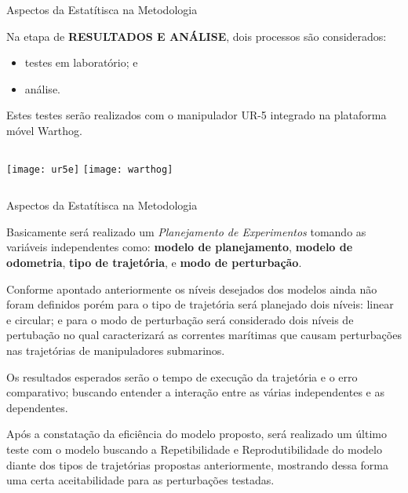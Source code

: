 \begin{frame}[t]{Aspectos da Estatítisca na Metodologia}


    Na etapa de \textbf{RESULTADOS E ANÁLISE}, dois processos são considerados:
    \begin{itemize}
        \item testes em laboratório; e 
        \item análise.
    \end{itemize}
    Estes testes serão realizados com o manipulador UR-5 integrado na plataforma móvel Warthog.

    \begin{columns}
            \centering
            \texttt{[image: ur5e]}
            \centering
            \texttt{[image: warthog]}
    \end{columns}

\end{frame}
\begin{frame}[t, shrink=10]{Aspectos da Estatítisca na Metodologia}

    Basicamente será realizado um \textit{Planejamento de Experimentos} tomando as variáveis independentes como: \textbf{modelo de planejamento}, \textbf{modelo de odometria}, \textbf{tipo de trajetória}, e \textbf{modo de perturbação}.
    \vspace*{0.2cm}

    Conforme apontado anteriormente os níveis desejados dos modelos ainda não foram definidos porém para o tipo de trajetória será planejado dois níveis: linear e circular; e para o modo de perturbação será considerado dois níveis de pertubação no qual caracterizará as correntes marítimas que causam perturbações nas trajetórias de manipuladores submarinos.

    \vspace*{0.2cm}
    Os resultados esperados serão o tempo de execução da trajetória e o erro comparativo; buscando entender a interação entre as várias independentes e as dependentes.

    \vspace*{0.2cm}
    Após a constatação da eficiência do modelo proposto, será realizado um último teste com o modelo buscando a Repetibilidade e Reprodutibilidade do modelo diante dos tipos de trajetórias propostas anteriormente, mostrando dessa forma uma certa aceitabilidade para as perturbações testadas.

\end{frame}
